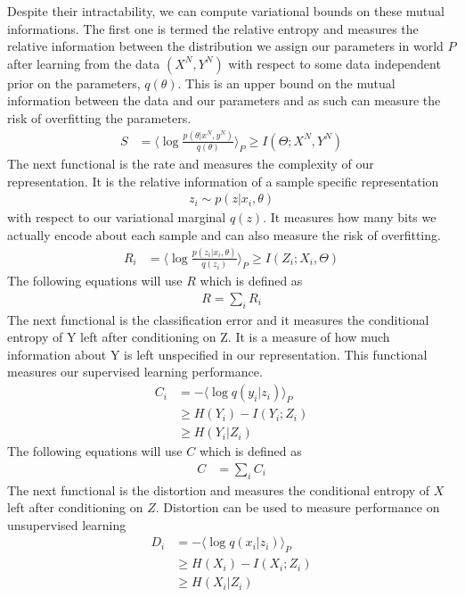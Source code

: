 \documentclass[book.tex]{subfiles}
\begin{document}
Despite their intractability, we can compute variational bounds on these mutual informations. The first one is termed the relative entropy and measures the relative information between the distribution we assign our parameters in world $P$ after learning from the data $(X^N,Y^N)$ with respect to some data independent prior on the parameters, $q(\theta)$. This is an upper bound on the mutual information between the data and our parameters and as such can measure the risk of overfitting the parameters.
\begin{align}
S&=\langle \log \frac{p(\theta|x^N,y^N)}{q(\theta)} \rangle_P \geq I(\Theta;X^N,Y^N)
\end{align}
The next functional is the rate and measures the complexity of our representation. It is the relative information of a sample specific representation 
\begin{align}
z_i \sim p(z|x_i,\theta)
\end{align} 
with respect to our variational marginal $q(z)$. It measures how many bits we actually encode about each sample and can also measure the risk of overfitting.
\begin{align}
R_i &= \langle \log\frac{p(z_i|x_i,\theta)}{q(z_i)} \rangle_P \geq I(Z_i;X_i,\Theta)
\end{align}
The following equations will use $R$ which is defined as 
\begin{align}R=\sum_i R_i
\end{align} 
The next functional is the classification error and it measures the conditional entropy of Y left after conditioning on Z. It is a measure of how much information about Y is left unspecified in our representation. This functional measures our supervised learning performance.
\begin{align}
C_i & =-\langle \log q(y_i|z_i) \rangle_P \\
&\geq H(Y_i) - I(Y_i;Z_i)\\ 
& \geq H(Y_i|Z_i)
\end{align}
The following equations will use $C$ which is defined as 
\begin{align}
C &= \sum_i C_i
\end{align}
The next functional is the distortion and measures the conditional entropy of $X$ left after conditioning on $Z$. Distortion can be used to measure performance on unsupervised learning %
\begin{align}
D_i &=-\langle \log q(x_i|z_i) \rangle_P \\
& \geq H(X_i) - I(X_i;Z_i)\\ 
&\geq H(X_i|Z_i)
\end{align}
\end{document}
